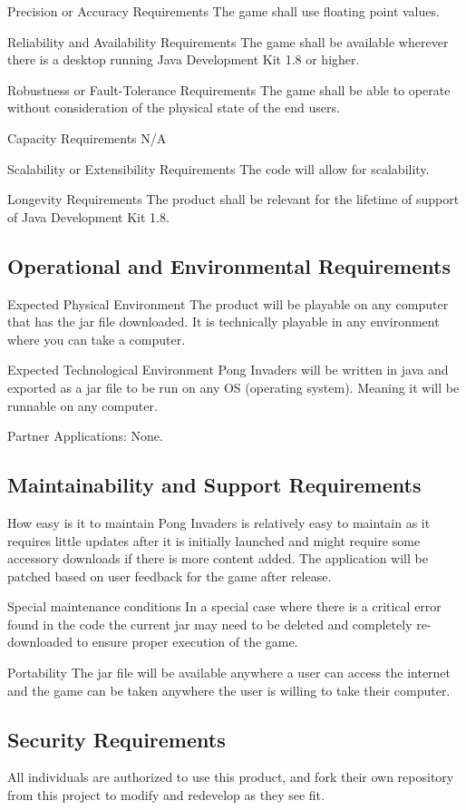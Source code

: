 \documentclass[12pt, titlepage]{article}
\begin{document}
Precision or Accuracy Requirements 
The game shall use floating point values. 

Reliability and Availability Requirements
The game shall be available wherever there is a desktop running Java Development Kit 1.8 or higher.

Robustness or Fault-Tolerance Requirements 
The game shall be able to operate without consideration of the physical state of the end users.

Capacity Requirements 
N/A

Scalability or Extensibility Requirements 
The code will allow for scalability.

Longevity Requirements 
The product shall be relevant for the lifetime of support of Java Development Kit 1.8.


\subsection{Operational and Environmental Requirements}
Expected Physical Environment
The product will be playable on any computer that has the jar file downloaded. It is technically playable in any environment where you can take a computer.
 
Expected Technological Environment
Pong Invaders will be written in java and exported as a jar file to be run on any OS (operating system). Meaning it will be runnable on any computer.

Partner Applications:
None.


\subsection{Maintainability and Support Requirements}
How easy is it to maintain
Pong Invaders is relatively easy to maintain as it requires little updates after it is initially launched and might require some accessory downloads if there is more content added. The application will be patched based on user feedback for the game after release.
 
Special maintenance conditions
In a special case where there is a critical error found in the code the current jar may need to be deleted and completely re-downloaded to ensure proper execution of the game.
 
Portability
The jar file will be available anywhere a user can access the internet and the game can be taken anywhere the user is willing to take their computer. 

\subsection{Security Requirements}
All individuals are authorized to use this product, and fork their own repository from this project to modify and redevelop as they see fit.
\end{document}
